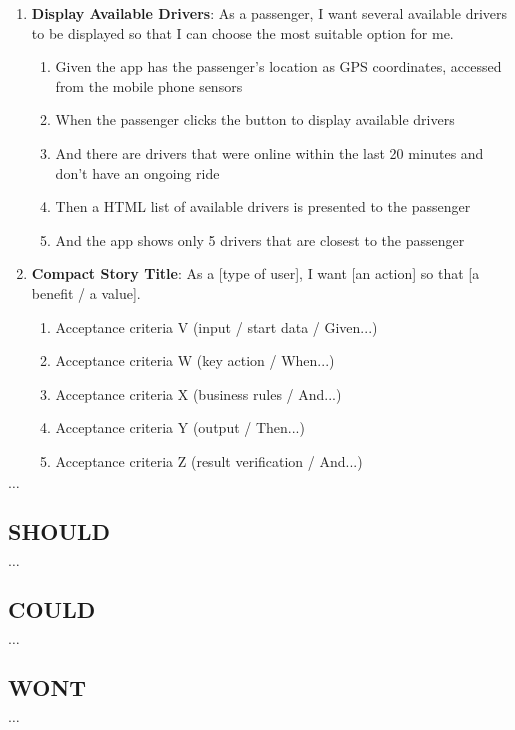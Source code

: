 \documentclass[conference,a4paper]{cs-techrep}
\begin{document}
\begin{enumerate}[{US}1]
	
\item \textbf{Display Available Drivers}: As a passenger, I want several available drivers to be displayed so that I can choose the most suitable option for me.
	\begin{enumerate}
	\item Given the app has the passenger's location as GPS coordinates, accessed from the mobile phone sensors
	\item When the passenger clicks the button to display available drivers
	\item And there are drivers that were online within the last 20 minutes and don’t have an ongoing ride
	\item Then a HTML list of available drivers is presented to the passenger
	\item And the app shows only 5 drivers that are closest to the passenger
	\end{enumerate}

\item \textbf{Compact Story Title}: As a [type of user], I want [an action] so that [a benefit / a value].
	\begin{enumerate}
	\item Acceptance criteria V (input / start data / Given...)
	\item Acceptance criteria W (key action / When...)
	\item Acceptance criteria X (business rules / And...)
	\item Acceptance criteria Y (output / Then...)
	\item Acceptance criteria Z (result verification / And...)
	\end{enumerate}

\end{enumerate}

$\ldots$

\subsection{SHOULD}
$\ldots$
\subsection{COULD}
$\ldots$
\subsection{WONT}
$\ldots$
\end{document}
